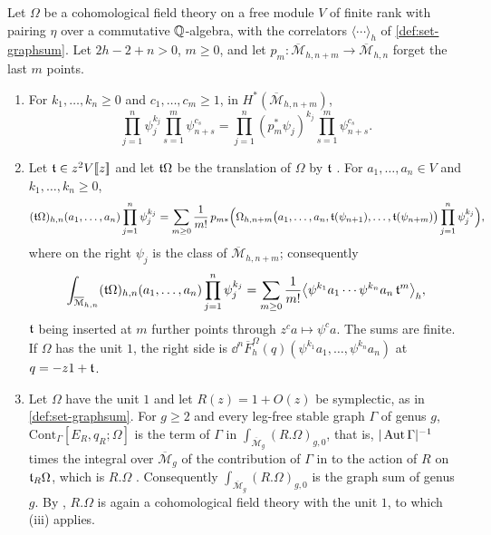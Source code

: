 \begin{lem}
\label{lem:set-pushins}
Let $\Omega$ be a cohomological field theory \cite[Def.~0.3]{PPZ15} on a free module $V$ of finite rank with pairing $\eta$ over a commutative $\mathbb{Q}$-algebra, with the correlators $\langle\cdots\rangle_h$ of \cref{def:set-graphsum}. Let $2h-2+n>0$, $m\geq0$, and let $p_m\colon\overline{\mathcal M}_{h,n+m}\to\overline{\mathcal M}_{h,n}$ forget the last $m$ points.
\begin{enumerate}
\item For $k_1,\dots,k_n\geq0$ and $c_1,\dots,c_m\geq1$, in $H^*(\overline{\mathcal M}_{h,n+m})$,
\[
\prod_{j=1}^n\psi_j^{k_j}\prod_{s=1}^m\psi_{n+s}^{c_s}=\prod_{j=1}^n(p_m^*\psi_j)^{k_j}\prod_{s=1}^m\psi_{n+s}^{c_s}.
\]
\item Let $\mathfrak{t}\in z^2V[\![ z ]\!]$ and let $\mathfrak{t}\Omega$ be the translation of $\Omega$ by $\mathfrak{t}$ \cite[Def.~2.5]{PPZ15}. For $a_1,\dots,a_n\in V$ and $k_1,\dots,k_n\geq0$,
\[
(\mathfrak{t}\Omega)_{h,n}(a_1,\dots,a_n)\prod_{j=1}^n\psi_j^{k_j}=\sum_{m\geq0}\frac1{m!}\,p_{m*}\Bigl(\Omega_{h,n+m}\bigl(a_1,\dots,a_n,\mathfrak{t}(\psi_{n+1}),\dots,\mathfrak{t}(\psi_{n+m})\bigr)\prod_{j=1}^n\psi_j^{k_j}\Bigr),
\]
where on the right $\psi_j$ is the class of $\overline{\mathcal M}_{h,n+m}$; consequently
\[
\int_{\overline{\mathcal M}_{h,n}}(\mathfrak{t}\Omega)_{h,n}(a_1,\dots,a_n)\prod_{j=1}^n\psi_j^{k_j}=\sum_{m\geq0}\frac1{m!}\bigl\langle\psi^{k_1}a_1\cdots\psi^{k_n}a_n\,\mathfrak{t}^m\bigr\rangle_h ,
\]
$\mathfrak{t}$ being inserted at $m$ further points through $z^ca\mapsto\psi^ca$. The sums are finite. If $\Omega$ has the unit $1$, the right side is $\dd^n\overline F^\Omega_h(q)(\psi^{k_1}a_1,\dots,\psi^{k_n}a_n)$ at $q=-z1+\mathfrak{t}$.
\item Let $\Omega$ have the unit $1$ and let $R(z)=1+O(z)$ be symplectic, as in \cref{def:set-graphsum}. For $g\geq2$ and every leg-free stable graph $\Gamma$ of genus $g$, $\mathrm{Cont}_\Gamma[E_R,q_R;\Omega]$ is the term of $\Gamma$ in $\int_{\overline{\mathcal M}_g}(R.\Omega)_{g,0}$, that is, $|\operatorname{Aut}\Gamma|^{-1}$ times the integral over $\overline{\mathcal M}_g$ of the contribution of $\Gamma$ in \cite[Def.~2.2]{PPZ15} to the action of $R$ on $\mathfrak{t}_R\Omega$, which is $R.\Omega$ \cite[Def.~2.13]{PPZ15}. Consequently $\int_{\overline{\mathcal M}_g}(R.\Omega)_{g,0}$ is the graph sum of genus $g$. By \cite[Prop.~2.12]{PPZ15}, $R.\Omega$ is again a cohomological field theory with the unit $1$, to which (iii) applies.
\end{enumerate}
\end{lem}

